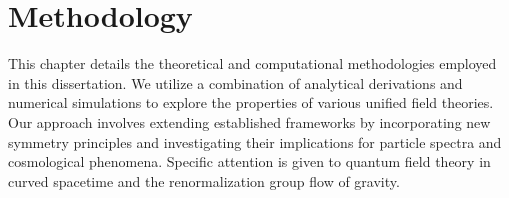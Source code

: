 \chapter{Methodology}
\label{chap:methodology}
This chapter details the theoretical and computational methodologies employed in this dissertation. We utilize a combination of analytical derivations and numerical simulations to explore the properties of various unified field theories. Our approach involves extending established frameworks by incorporating new symmetry principles and investigating their implications for particle spectra and cosmological phenomena. Specific attention is given to quantum field theory in curved spacetime and the renormalization group flow of gravity.
\blindtext[3] %
